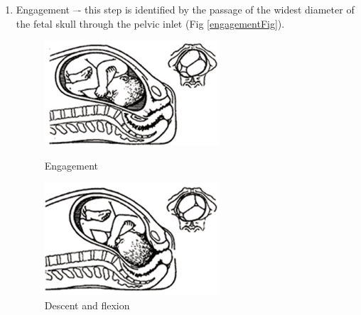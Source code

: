 \begin{enumerate}
\item Engagement –- this step is identified by the passage of the widest diameter of the fetal skull through the pelvic inlet (Fig \ref{engagementFig}).


\begin{figure}
\begin{minipage}[t]{6cm}
\begin{center}
\includegraphics[width=65mm]{sections/introduction/images/Justengagement.png}
\caption{\label{engagementFig} Engagement}
\end{center}
\end{minipage}
\hfill
\begin{minipage}[t]{6cm}
\begin{center}
\includegraphics[width=65mm]{sections/introduction/images/Engagementflexion.png}
\caption[Descent and flexion]{\label{flexionFIg} Descent and flexion}
\end{center}
\end{minipage}
\end{figure}



\end{enumerate}
